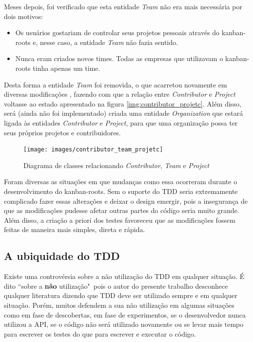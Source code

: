 Meses depois, foi verificado que esta entidade \textit{Team} não era mais necessária por dois motivos:

\begin{itemize}
  \item Os usuários gostariam de controlar seus projetos pessoais através do kanban-roots e, nesse caso, a entidade \textit{Team} não fazia sentido.
  \item Nunca eram criados novos times. Todas as empresas que utilizavam o kanban-roots tinha apenas um time.
\end{itemize}

Desta forma a entidade \textit{Team} foi removida, o que acarretou novamente em diversas modificações \cite{CommitRemoveTeam}, fazendo com que a relação entre \textit{Contributor} e \textit{Project} voltasse ao estado apresentado na figura \ref{img:contributor_projetc}. Além disso, será (ainda não foi implementado) criada uma entidade \textit{Organization} que estará ligada às entidades \textit{Contributor} e \textit{Project}, para que uma organização possa ter seus próprios projetos e contribuidores.

\begin{figure}[h]
  \center
  \caption{Diagrama de classes relacionando \textit{Contributor}, \textit{Team} e \textit{Project}}
  \texttt{[image: images/contributor\_team\_projetc]}
  \label{img:contributor_team_projetc}
\end{figure}

Foram diversas as situações em que mudanças como essa ocorreram durante o desenvolvimento do kanban-roots. Sem o suporte do TDD seria extremamente complicado fazer essas alterações e deixar o design emergir, pois a insegurança de que as modificações pudesse afetar outras partes do código seria muito grande. Além disso, a criação a priori dos testes favoreceu que as modificações fossem feitas de maneira mais simples, direta e rápida.

\subsection{A ubiquidade do TDD}
\label{sub:a_ubiquidade_do_tdd}

Existe uma controvérsia sobre a não utilização do TDD em qualquer situação. É dito ``sobre a \textbf{não} utilização"\ pois o autor do presente trabalho desconhece qualquer literatura dizendo que TDD deve ser utilizado sempre e em qualquer situação. Porém, muitos defendem a sua não utilização em algumas situações como em fase de descobertas, em fase de experimentos, se o desenvolvedor nunca utilizou a API, se o código não será utilizado novamente ou se levar mais tempo para escrever os testes do que para escrever e executar o código.

